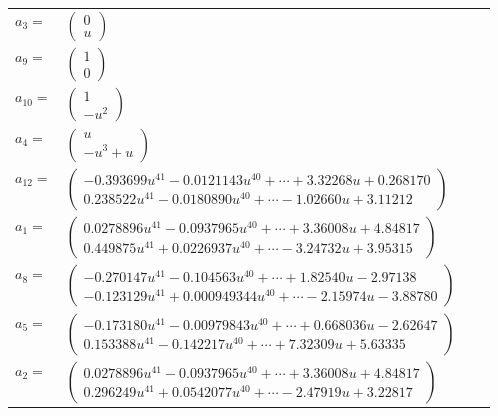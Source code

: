 \documentclass[1p]{elsarticle_modified}
\theoremstyle{definition}
\begin{document}
\begin{tabular}{m{7pt} m{180pt} m{7pt} m{180pt} }
\flushright $a_{3}=$&$\begin{pmatrix}0\\u\end{pmatrix}$ \\
\flushright $a_{9}=$&$\begin{pmatrix}1\\0\end{pmatrix}$ \\
\flushright $a_{10}=$&$\begin{pmatrix}1\\- u^2\end{pmatrix}$ \\
\flushright $a_{4}=$&$\begin{pmatrix}u\\- u^3+u\end{pmatrix}$ \\
\flushright $a_{12}=$&$\begin{pmatrix}-0.393699 u^{41}-0.0121143 u^{40}+\cdots+3.32268 u+0.268170\\0.238522 u^{41}-0.0180890 u^{40}+\cdots-1.02660 u+3.11212\end{pmatrix}$ \\
\flushright $a_{1}=$&$\begin{pmatrix}0.0278896 u^{41}-0.0937965 u^{40}+\cdots+3.36008 u+4.84817\\0.449875 u^{41}+0.0226937 u^{40}+\cdots-3.24732 u+3.95315\end{pmatrix}$ \\
\flushright $a_{8}=$&$\begin{pmatrix}-0.270147 u^{41}-0.104563 u^{40}+\cdots+1.82540 u-2.97138\\-0.123129 u^{41}+0.000949344 u^{40}+\cdots-2.15974 u-3.88780\end{pmatrix}$ \\
\flushright $a_{5}=$&$\begin{pmatrix}-0.173180 u^{41}-0.00979843 u^{40}+\cdots+0.668036 u-2.62647\\0.153388 u^{41}-0.142217 u^{40}+\cdots+7.32309 u+5.63335\end{pmatrix}$ \\
\flushright $a_{2}=$&$\begin{pmatrix}0.0278896 u^{41}-0.0937965 u^{40}+\cdots+3.36008 u+4.84817\\0.296249 u^{41}+0.0542077 u^{40}+\cdots-2.47919 u+3.22817\end{pmatrix}$ \\

\end{tabular}
\end{document}
